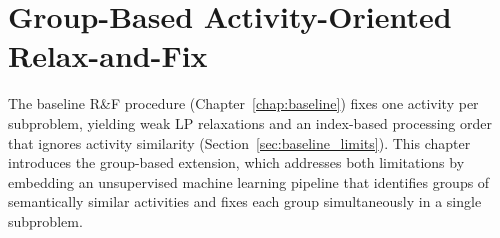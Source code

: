 \chapter{Group-Based Activity-Oriented Relax-and-Fix}
\label{chap:grouprf}
The baseline R\&F procedure (Chapter~\ref{chap:baseline}) fixes
one activity per subproblem, yielding weak LP relaxations and an
index-based processing order that ignores activity similarity
(Section~\ref{sec:baseline_limits}). This chapter introduces
the group-based extension, which addresses both limitations by
embedding an unsupervised machine learning pipeline that
identifies groups of semantically similar activities and fixes
each group simultaneously in a single subproblem.


